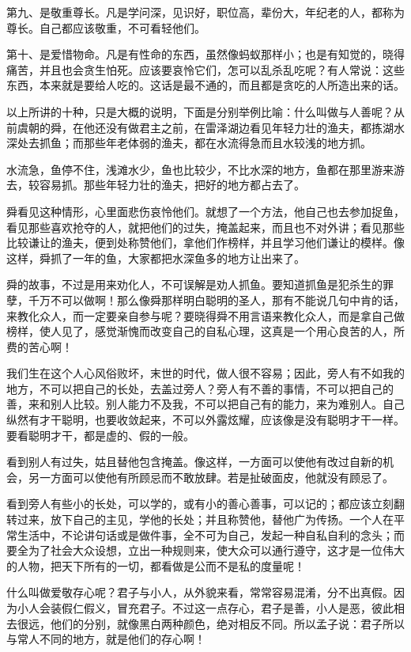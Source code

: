 \documentclass[12pt,twoside,openany]{book}
\begin{document}
第九、是敬重尊长。凡是学问深，见识好，职位高，辈份大，年纪老的人，都称为尊长。自己都应该敬重，不可看轻他们。

第十、是爱惜物命。凡是有性命的东西，虽然像蚂蚁那样小；也是有知觉的，晓得痛苦，并且也会贪生怕死。应该要哀怜它们，怎可以乱杀乱吃呢？有人常说：这些东西，本来就是要给人吃的。这话是最不通的，而且都是贪吃的人所造出来的话。

以上所讲的十种，只是大概的说明，下面是分别举例比喻：什么叫做与人善呢？从前虞朝的舜，在他还没有做君主之前，在雷泽湖边看见年轻力壮的渔夫，都拣湖水深处去抓鱼；而那些年老体弱的渔夫，都在水流得急而且水较浅的地方抓。

水流急，鱼停不住，浅滩水少，鱼也比较少，不比水深的地方，鱼都在那里游来游去，较容易抓。那些年轻力壮的渔夫，把好的地方都占去了。

舜看见这种情形，心里面悲伤哀怜他们。就想了一个方法，他自己也去参加捉鱼，看见那些喜欢抢夺的人，就把他们的过失，掩盖起来，而且也不对外讲；看见那些比较谦让的渔夫，便到处称赞他们，拿他们作榜样，并且学习他们谦让的模样。像这样，舜抓了一年的鱼，大家都把水深鱼多的地方让出来了。

舜的故事，不过是用来劝化人，不可误解是劝人抓鱼。要知道抓鱼是犯杀生的罪孽，千万不可以做啊！那么像舜那样明白聪明的圣人，那有不能说几句中肯的话，来教化众人，而一定要亲自参与呢？要晓得舜不用言语来教化众人，而是拿自己做榜样，使人见了，感觉渐愧而改变自己的自私心理，这真是一个用心良苦的人，所费的苦心啊！

我们生在这个人心风俗败坏，末世的时代，做人很不容易；因此，旁人有不如我的地方，不可以把自己的长处，去盖过旁人？旁人有不善的事情，不可以把自己的善，来和别人比较。别人能力不及我，不可以把自己有的能力，来为难别人。自己纵然有才干聪明，也要收敛起来，不可以外露炫耀，应该像是没有聪明才干一样。要看聪明才干，都是虚的、假的一般。

看到别人有过失，姑且替他包含掩盖。像这样，一方面可以使他有改过自新的机会，另一方面可以使他有所顾忌而不敢放肆。若是扯破面皮，他就没有顾忌了。

看到旁人有些小的长处，可以学的，或有小的善心善事，可以记的；都应该立刻翻转过来，放下自己的主见，学他的长处；并且称赞他，替他广为传扬。一个人在平常生活中，不论讲句话或是做件事，全不可为自己，发起一种自私自利的念头；而要全为了社会大众设想，立出一种规则来，使大众可以通行遵守，这才是一位伟大的人物，把天下所有的一切，都看做是公而不是私的度量呢！

什么叫做爱敬存心呢？君子与小人，从外貌来看，常常容易混淆，分不出真假。因为小人会装假仁假义，冒充君子。不过这一点存心，君子是善，小人是恶，彼此相去很远，他们的分别，就像黑白两种颜色，绝对相反不同。所以孟子说：君子所以与常人不同的地方，就是他们的存心啊！
\end{document}
